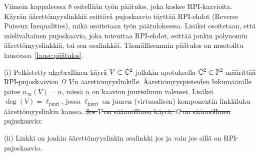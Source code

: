 Viimein kappaleessa 8 esitellään työn päätulos, joka koskee RPI-kaavioita. Käyrän äärettömyyslinkkiä esittävä pujoskaavio täyttää RPI-ehdot (Reverse Puiseux Inequalities), mikä osoitetaan työn päätuloksessa. Lisäksi osoitetaan, että mielivaltainen pujoskaavio, joka toteuttaa RPI-ehdot, esittää jonkin polynomin äärettömyyslinkkiä, tai sen osalinkkiä. Täsmällisemmin päätulos on muotoiltu lauseessa~\ref{lause:päätulos}.
\begin{lause}
    \label{lause:päätulos}
    (i) Pelkistetty algebrallinen käyrä $V\subset\mathbb{C}^2$ jollakin upotuksella $\mathbb{C}^2\subset\mathbb{P}^2$ määrittää RPI-pujoskaavion $\Omega$ $V$:n äärettömyyslinkille. Äärettömyyspisteiden lukumäärälle pätee $n_\infty(V)=n$, missä $n$ on kaavion juurisilmun valenssi. Lisäksi $\deg(V)=\ell_\text{juuri}$, jossa $\ell_\text{juuri}$ on juuren (virtuaalisen) komponentin linkkiluku äärettömyyslinkin kanssa. \sout{Jos $V$ on säännöllinen käyrä, $\Omega$ on säännöllinen pujoskaavio.}

    (ii) Linkki on jonkin äärettömyyslinkin osalinkki jos ja vain jos sillä on RPI-pujoskaavio.
\end{lause}